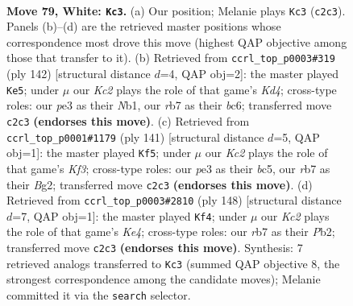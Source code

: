 \documentclass[11pt]{article}
\begin{document}
\clearpage

\begin{figure}[p]\centering
\begin{subfigure}{0.46\textwidth}\centering
\resizebox{\linewidth}{!}{%
\newchessgame
\chessboard[
  setfen={8/1r6/6k1/8/8/4pp2/2K3p1/8 w - - 0 79},
  showmover=false,
  pgfstyle=straightmove, color=movearrow, markmove={c2-c3}
]}
\caption{}
\end{subfigure}\hfill
\begin{subfigure}{0.46\textwidth}\centering
\resizebox{\linewidth}{!}{%
\newchessgame
\chessboard[
  setfen={8/5k2/1pb5/p7/3K4/8/8/1N6 w - - 4 72},
  showmover=false,
  pgfstyle=straightmove, color=movearrow, markmove={d4-e5}
]}
\caption{}
\end{subfigure}
\\[4pt]
\begin{subfigure}{0.46\textwidth}\centering
\resizebox{\linewidth}{!}{%
\newchessgame
\chessboard[
  setfen={8/8/5k2/2B5/8/1P6/P5b1/4K3 b - - 16 71},
  showmover=false,
  pgfstyle=straightmove, color=movearrow, markmove={f6-f5}
]}
\caption{}
\end{subfigure}\hfill
\begin{subfigure}{0.46\textwidth}\centering
\resizebox{\linewidth}{!}{%
\newchessgame
\chessboard[
  setfen={8/6p1/3k2Pp/8/4K3/8/1P6/8 w - - 1 75},
  showmover=false,
  pgfstyle=straightmove, color=movearrow, markmove={e4-f4}
]}
\caption{}
\end{subfigure}
\caption{\textbf{Move 79, White: \texttt{Kc3}.} (a) Our position; Melanie plays \texttt{Kc3} (\texttt{c2c3}). Panels (b)--(d) are the retrieved master positions whose correspondence most drove this move (highest QAP objective among those that transfer to it). (b) Retrieved from \texttt{ccrl\_top\_p0003\#319} (ply 142) [structural distance $d$=4, QAP obj=2]: the master played \texttt{Ke5}; under $\mu$ our \emph{Kc2} plays the role of that game's \emph{Kd4}; cross-type roles: our \emph{p}e3 as their \emph{N}b1, our \emph{r}b7 as their \emph{b}c6; transferred move \texttt{c2c3} \textbf{(endorses this move)}. (c) Retrieved from \texttt{ccrl\_top\_p0001\#1179} (ply 141) [structural distance $d$=5, QAP obj=1]: the master played \texttt{Kf5}; under $\mu$ our \emph{Kc2} plays the role of that game's \emph{Kf3}; cross-type roles: our \emph{p}e3 as their \emph{b}c5, our \emph{r}b7 as their \emph{B}g2; transferred move \texttt{c2c3} \textbf{(endorses this move)}. (d) Retrieved from \texttt{ccrl\_top\_p0003\#2810} (ply 148) [structural distance $d$=7, QAP obj=1]: the master played \texttt{Kf4}; under $\mu$ our \emph{Kc2} plays the role of that game's \emph{Ke4}; cross-type roles: our \emph{r}b7 as their \emph{P}b2; transferred move \texttt{c2c3} \textbf{(endorses this move)}. Synthesis: 7 retrieved analogs transferred to \texttt{Kc3} (summed QAP objective 8, the strongest correspondence among the candidate moves); Melanie committed it via the \texttt{search} selector.}
\label{fig:thought-m156}
\end{figure}
\end{document}
